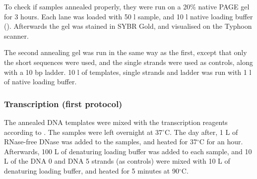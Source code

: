 To check if samples annealed properly, they were run on a 20\% native PAGE gel for 3 hours. Each lane was loaded with 50 \si{\micro}l sample, and 10 \si{\micro}l native loading buffer (). Afterwards the gel was stained in SYBR Gold, and visualised on the Typhoon scanner.

The second annealing gel was run in the same way as the first, except that only the short sequences were used, and the single strands were used as controls, along with a 10 bp ladder. 10 \si{\micro}l of templates, single strands and ladder was run with 1 \si{\micro}l of native loading buffer.


\subsubsection{Transcription (first protocol)}
The annealed DNA templates were mixed with the transcription reagents according to . The samples were left overnight at 37$^\circ$C. The day after, 1 \si{\micro}L of RNase-free DNase was added to the samples, and heated for 37$^\circ$C for an hour. Afterwards, 100 \si{\micro}L of denaturing loading buffer was added to each sample, and 10 \si{\micro}L of the DNA 0 and DNA 5 strands (as controls) were mixed with 10 \si{\micro}L of denaturing loading buffer, and heated for 5 minutes at 90$^\circ$C.

